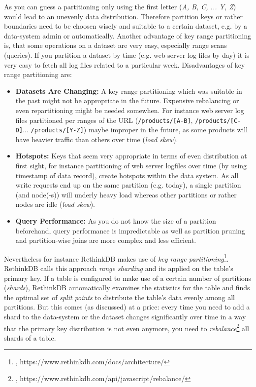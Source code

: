 {As you can guess a partitioning only using the first letter (\textit{A, B, C, ... Y, Z}) would lead to an unevenly data distribution. Therefore partition keys or rather boundaries need to be choosen wisely and suitable to a certain dataset, e.g. by a data-system admin or automatically. Another advantage of key range partitioning is, that some operations on a dataset are very easy, especially range scans (queries). If you partition a dataset by time (e.g. web server log files by day) it is very easy to fetch all log files related to a particular week.
Disadvantages of key range partitioning are:
\begin{itemize}
\item \textbf{Datasets Are Changing:} A key range partitioning which was suitable in the past might not be appropriate in the future. Expensive rebalancing or even repartitioning might be needed somewhen. For instance web server log files partitioned per ranges of the URL (\lstinline{/products/[A-B]}, \lstinline{/products/[C-D]}... \lstinline{/products/[Y-Z]}) maybe improper in the future, as some products will have heavier traffic than others over time (\textit{load skew}).
\item \textbf{Hotspots:} Keys that seem very appropriate in terms of even distribution at first sight, for instance partitioning of web server logfiles over time (by using timestamp of data record), create hotspots within the data system. As all write requests end up on the same partition (e.g. today), a single partition (and node(-s)) will underly heavy load whereas other partitions or rather nodes are idle (\textit{load skew}).
\item \textbf{Query Performance:} As you do not know the size of a partition beforehand, query performance is impredictable as well as partition pruning and partition-wise joins are more complex and less efficient. \\
\end{itemize}

Nevertheless for instance RethinkDB makes use of \textit{key range partitioning}\footnote{\cite{RDBARCH}, https://www.rethinkdb.com/docs/architecture/}. RethinkDB calls this approach \textit{range sharding} and its applied on the table’s primary key. If a table is configured to make use of a certain number of partitions (\textit{shards}), RethinkDB automatically examines the statistics for the table and finds the optimal set of \textit{split points} to distribute the table's data evenly among all partitions. But this comes (as discussed) at a price: every time you need to add a shard to the data-system or the dataset changes significantly over time in a way that the primary key distribution is not even anymore, you need to \textit{rebalance}\footnote{\cite{RDBREB}, https://www.rethinkdb.com/api/javascript/rebalance/} all shards of a table.

}
